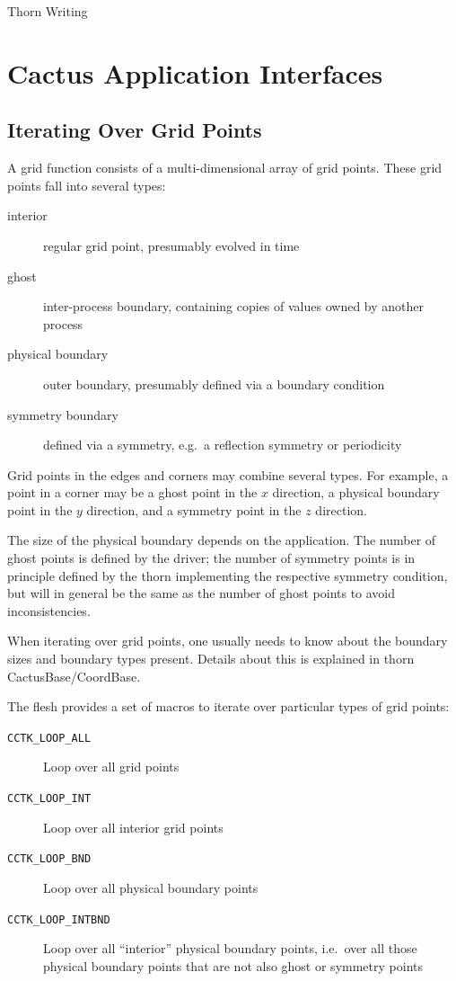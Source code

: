 \begin{cactuspart}{Thorn Writing}

\section{Cactus Application Interfaces}


\subsection{Iterating Over Grid Points}
\label{sec:CactusAPI.gridpoints}

A grid function consists of a multi-dimensional array of grid points.
These grid points fall into several types:
\begin{description}
\item[interior] regular grid point, presumably evolved in time
\item[ghost] inter-process boundary, containing copies of values owned
  by another process
\item[physical boundary] outer boundary, presumably defined via a
  boundary condition
\item[symmetry boundary] defined via a symmetry, e.g.\ a reflection
  symmetry or periodicity
\end{description}
Grid points in the edges and corners may combine several types. For
example, a point in a corner may be a ghost point in the $x$
direction, a physical boundary point in the $y$ direction, and a
symmetry point in the $z$ direction.

The size of the physical boundary depends on the application. The
number of ghost points is defined by the driver; the number of
symmetry points is in principle defined by the thorn implementing the
respective symmetry condition, but will in general be the same as the
number of ghost points to avoid inconsistencies.

When iterating over grid points, one usually needs to know about the
boundary sizes and boundary types present. Details about this is
explained in thorn CactusBase/CoordBase.

The flesh provides a set of macros to iterate over particular types of
grid points:
\begin{description}
\item[\texttt{CCTK\_LOOP\_ALL}] Loop over all grid points
\item[\texttt{CCTK\_LOOP\_INT}] Loop over all interior grid points
\item[\texttt{CCTK\_LOOP\_BND}] Loop over all physical boundary points
\item[\texttt{CCTK\_LOOP\_INTBND}] Loop over all ``interior'' physical
  boundary points, i.e.\ over all those physical boundary points that
  are not also ghost or symmetry points
\end{description}


\end{cactuspart}
